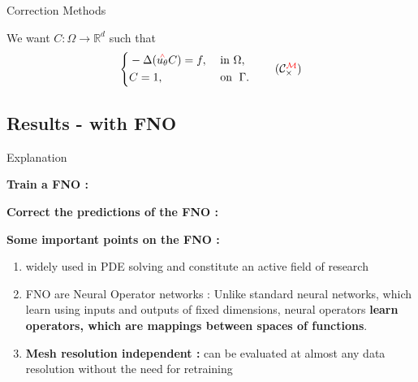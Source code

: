 \begin{frame}[noframenumbering]{Correction Methods}
\begin{minipage}{0.48\linewidth}
        We want $C: \Omega \rightarrow \mathbb{R}^d$ such that
        \begin{equation*}
            \left\{\begin{aligned}
                &-\Delta (\uchapeau{u_\theta} C)=f, \; &&\text{in } \Omega, \\
                &C=1, \; &&\text{on } \; \Gamma.
            \end{aligned}\right. \tag{$\mathcal{C}_\times^{\mathcolor{red}{\mathcal{M}}}$} \label{corr_mult_reh}
        \end{equation*}
    \end{minipage}
\end{frame}

\subsection{Results - with FNO}

\begin{frame}{Explanation}
    \vspace{5pt}
    \begin{minipage}{0.48\linewidth}
        \textbf{Train a FNO :}
        
    \end{minipage} \quad
    \begin{minipage}{0.48\linewidth}
        \textbf{Correct the predictions of the FNO :}
        
    \end{minipage}

    \vspace{15pt}
    \textbf{Some important points on the FNO :}
    \begin{enumerate}[\ding{217}]        
        \item widely used in PDE solving and constitute an active field of research
        \item FNO are Neural Operator networks : Unlike standard neural networks, which learn using inputs and outputs of fixed dimensions, neural operators \textbf{learn operators, which are mappings between spaces of functions}.
        \item \textbf{Mesh resolution independent :} can be evaluated at almost any data resolution without the need for retraining
    \end{enumerate}
\end{frame}

